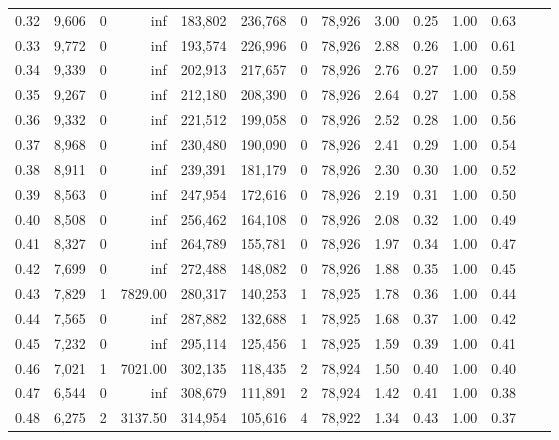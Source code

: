 \begin{tabular}{rrrrrrrrrrrrrr}
0.32 &  9,606 &      0 &      inf &  183,802 &  236,768 &       0 &  78,926 &  3.00 &  0.25 &  1.00 &      0.63 \\
0.33 &  9,772 &      0 &      inf &  193,574 &  226,996 &       0 &  78,926 &  2.88 &  0.26 &  1.00 &      0.61 \\
0.34 &  9,339 &      0 &      inf &  202,913 &  217,657 &       0 &  78,926 &  2.76 &  0.27 &  1.00 &      0.59 \\
0.35 &  9,267 &      0 &      inf &  212,180 &  208,390 &       0 &  78,926 &  2.64 &  0.27 &  1.00 &      0.58 \\
0.36 &  9,332 &      0 &      inf &  221,512 &  199,058 &       0 &  78,926 &  2.52 &  0.28 &  1.00 &      0.56 \\
0.37 &  8,968 &      0 &      inf &  230,480 &  190,090 &       0 &  78,926 &  2.41 &  0.29 &  1.00 &      0.54 \\
0.38 &  8,911 &      0 &      inf &  239,391 &  181,179 &       0 &  78,926 &  2.30 &  0.30 &  1.00 &      0.52 \\
0.39 &  8,563 &      0 &      inf &  247,954 &  172,616 &       0 &  78,926 &  2.19 &  0.31 &  1.00 &      0.50 \\
0.40 &  8,508 &      0 &      inf &  256,462 &  164,108 &       0 &  78,926 &  2.08 &  0.32 &  1.00 &      0.49 \\
0.41 &  8,327 &      0 &      inf &  264,789 &  155,781 &       0 &  78,926 &  1.97 &  0.34 &  1.00 &      0.47 \\
0.42 &  7,699 &      0 &      inf &  272,488 &  148,082 &       0 &  78,926 &  1.88 &  0.35 &  1.00 &      0.45 \\
0.43 &  7,829 &      1 &  7829.00 &  280,317 &  140,253 &       1 &  78,925 &  1.78 &  0.36 &  1.00 &      0.44 \\
0.44 &  7,565 &      0 &      inf &  287,882 &  132,688 &       1 &  78,925 &  1.68 &  0.37 &  1.00 &      0.42 \\
0.45 &  7,232 &      0 &      inf &  295,114 &  125,456 &       1 &  78,925 &  1.59 &  0.39 &  1.00 &      0.41 \\
0.46 &  7,021 &      1 &  7021.00 &  302,135 &  118,435 &       2 &  78,924 &  1.50 &  0.40 &  1.00 &      0.40 \\
0.47 &  6,544 &      0 &      inf &  308,679 &  111,891 &       2 &  78,924 &  1.42 &  0.41 &  1.00 &      0.38 \\
0.48 &  6,275 &      2 &  3137.50 &  314,954 &  105,616 &       4 &  78,922 &  1.34 &  0.43 &  1.00 &      0.37 \\

\end{tabular}
